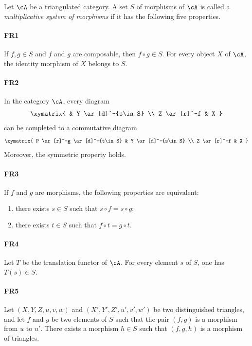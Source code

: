 \documentclass[oneside]{book}
\begin{document}
\begin{definition}
Let $\cA$ be a triangulated category. A set $S$ of morphisms of $\cA$ is
called a \emph{multiplicative system of morphisms} if it has the following
five properties.

\paragraph{FR1}
\hypertarget{VIII:FR1}{}
If $f,g\in S$ and $f$ and $g$ are composable, then $f\circ g\in S$. For
every object $X$ of $\cA$, the identity morphism of $X$ belongs to $S$.

\paragraph{FR2}
\hypertarget{VIII:FR2}{}
In the category $\cA$, every diagram
\[\xymatrix{
  & Y \ar[d]^-{s\in S} \\
  Z \ar[r]^-f
    & X
}\]
can be completed to a commutative diagram
\[\xymatrix{
  P \ar[r]^-g \ar[d]^-{t\in S}
    & Y \ar[d]^-{s\in S} \\
  Z \ar[r]^-f
    & X
}\]
Moreover, the symmetric property holds.

\paragraph{FR3}
\hypertarget{VIII:FR3}{}
If $f$ and $g$ are morphisms, the following properties are equivalent:
\begin{enumerate}[\indent i)]
  \item there exists $s\in S$ such that $s\circ f=s\circ g$;
  \item there exists $t\in S$ such that $f\circ t=g\circ t$.
\end{enumerate}

\paragraph{FR4}
\hypertarget{VIII:FR4}{}
Let $T$ be the translation functor of $\cA$. For every element $s$ of $S$,
one has $T(s)\in S$.

\paragraph{FR5}
\hypertarget{VIII:FR5}{}
Let $(X,Y,Z,u,v,w)$ and $(X',Y',Z',u',v',w')$ be two distinguished
triangles, and let $f$ and $g$ be two elements of $S$ such that the pair
$(f,g)$ is a morphism from $u$ to $u'$. There exists a morphism $h\in S$
such that $(f,g,h)$ is a morphism of triangles.
\end{definition}
\end{document}
